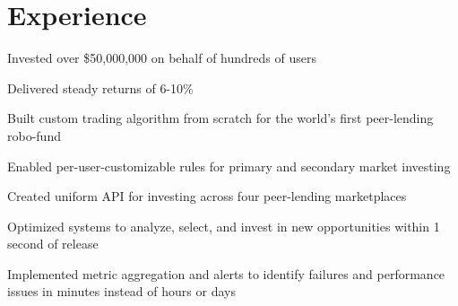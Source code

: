 \documentclass[]{resume}
\begin{document}
\begin{minipage}[t]{0.66\textwidth} 



\section{Experience}

\vspace{\topsep} %
\begin{tightemize}
\item Invested over \$50,000,000 on behalf of hundreds of users
\item Delivered steady returns of 6-10\%
\item Built custom trading algorithm from scratch for the world's first peer-lending robo-fund
\item Enabled per-user-customizable rules for primary and secondary market investing
\item Created uniform API for investing across four peer-lending marketplaces
\item Optimized systems to analyze, select, and invest in new opportunities within 1 second of release
\item Implemented metric aggregation and alerts to identify failures and performance issues in minutes instead of hours or days
\end{tightemize}
\sectionsep


\end{minipage}
\end{document}
